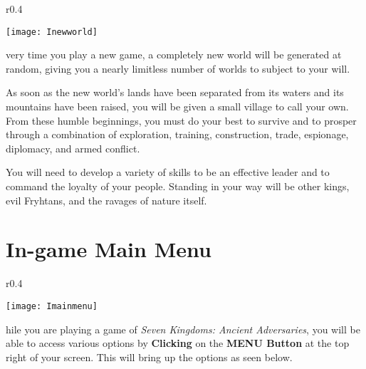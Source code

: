 \begin{wrapfigure}{r}{0.4\textwidth}
    \begin{center}
        \vspace{-20pt}
        \texttt{[image: Inewworld]} %
    \end{center}
\vspace{-20pt}
\end{wrapfigure}

very time you play a new game, a completely new world will be generated at random, giving you a nearly limitless number of worlds to subject to your will.

As soon as the new world’s lands have been separated from its waters and its mountains have been raised, you will be given a small village to call your own. From these humble beginnings, you must do your best to survive and to prosper through a combination of exploration, training, construction, trade, espionage, diplomacy, and armed conflict.

You will need to develop a variety of skills to be an effective leader and to command the loyalty of your people. Standing in your way will be other kings, evil Fryhtans, and the ravages of nature itself.


\section{\textsf{In-game Main Menu}}


\begin{wrapfigure}{r}{0.4\textwidth}
    \begin{center}
        \vspace{-20pt}
        \texttt{[image: Imainmenu]} %
    \end{center}
    \vspace{-90pt} %
\end{wrapfigure}


hile you are playing a game of \textit{Seven Kingdoms: Ancient Adversaries}, you will be able to access various options by \textbf{Clicking} on the \textbf{MENU Button} at the top right of your screen. This will bring up the options as seen below.

